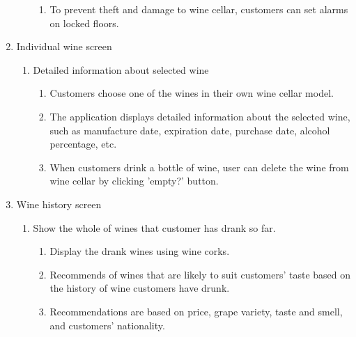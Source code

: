 \documentclass[conference]{IEEEtran}
\numberwithin{figure}{subsection}
\begin{document}
\begin{enumerate}
\begin{enumerate}
\begin{enumerate}
            \item To prevent theft and damage to wine cellar, customers 	can set alarms on locked floors.
        \end{enumerate}
    \end{enumerate}
    \item Individual wine screen
    \begin{enumerate}
        \item Detailed information about selected wine
        \begin{enumerate}
            \item Customers choose one of the wines in their own wine
            cellar model.
            \item The application displays detailed information about 	the selected wine, such as manufacture date, expiration 	date, purchase date, alcohol percentage, etc.
            \item When customers drink a bottle of wine, user can delete the wine from wine cellar by clicking 'empty?' button.
        \end{enumerate}
    \end{enumerate}
    \item Wine history screen
    \begin{enumerate}
        \item Show the whole of wines that customer has drank so far.
        \begin{enumerate}
            \item Display the drank wines using wine corks.
            \item Recommends of wines that are likely to suit
        	customers’ taste based on the history of wine customers	have drunk.
        	\item Recommendations are based on price, grape variety, taste and smell, and customers’ nationality.
        \end{enumerate}
    \end{enumerate}
\end{enumerate}
\end{document}
